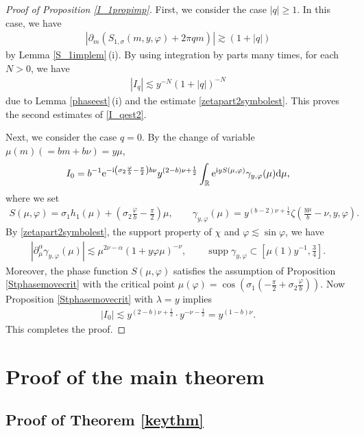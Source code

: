 \documentclass[10pt,a4paper]{amsart}
\numberwithin{equation}{section}
\def\R{\mathbb{R}}%
\DeclareMathOperator{\supp}{supp}%
\def\a{\alpha}
\def\c{\gamma}
\def\f{\varphi}
\def\l{\lambda}
\def\m{\mu}
\def\n{\nu}
\def\s{\sigma}
\def\z{\zeta}
\def\pa{\partial}
\begin{document}
\begin{proof}[Proof of Proposition \ref{I_1propimp}]
First, we consider the case $|q|\geq 1$. In this case, we have
\begin{align*}
|\pa_m(S_{1,\s}(m,y,\f)+2\pi qm)|\gtrsim (1+|q|)
\end{align*}
by Lemma \ref{S_1implem}\,(i).
By using integration by parts many times, for each $N>0$, we have
\begin{align*}
|I_q|\lesssim y^{-N}(1+|q|)^{-N}
\end{align*}
due to Lemma \ref{phaseest}\,(i) and the estimate \eqref{zetapart2symbolest}.
This proves the second estimates of \eqref{I_qest2}.

Next, we consider the case $q=0$. By the change of variable $\m(m)(=bm+b\n)=y\m$,
\[%
I_0=b^{-1}{\rm e}^{-{\rm i}\left(\s_2\frac{\f}{b}-\frac{\pi}{2}\right)b\n} y^{(2-b)\n+\frac{1}{2}}\int_{\R}{\rm e}^{{\rm i}yS(\m,\f) }\c_{y,\f}(\m) {\rm d}\m,
\]
where we set
\begin{align*}
S(\m,\f)=\s_1h_1(\m) +\left(\s_2\frac{\f}{b}-\frac{\pi}{2}\right)\m,\qquad \c_{y,\f}(\m)=y^{(b-2)\n+\frac{1}{2}}\z\left(\frac{y\m}{b}-\n,y,\f\right).
\end{align*}
By \eqref{zetapart2symbolest}, the support property of $\chi$ and $\f\lesssim\sin \f$, we have
\begin{align*}
|\pa_{\m}^{\a}\c_{y,\f}(\m)|\lesssim \m^{2\n-\a}(1+y \f\m)^{-\n},\qquad \supp \c_{y,\f}\subset \left[\m(1)y^{-1},\frac{3}{4}\right].
\end{align*}
Moreover, the phase function $S(\m,\f)$ satisfies the assumption of Proposition \ref{Stphasemovecrit} with the critical point $\m(\f)=\cos\left(\s_1\left(-\frac{\pi}{2}+\s_2\frac{\f}{b}\right)\right)$.
Now Proposition \ref{Stphasemovecrit} with $\l=y$ implies
\begin{align*}
|I_0|\lesssim y^{(2-b)\n+\frac{1}{2}}\cdot y^{-\n-\frac{1}{2}}=y^{(1-b)\n}.
\end{align*}
This completes the proof.
\end{proof}





\section{Proof of the main theorem}\label{proofsection}





\subsection{Proof of Theorem \ref{keythm}}
\label{subsec:proof}
\end{document}
